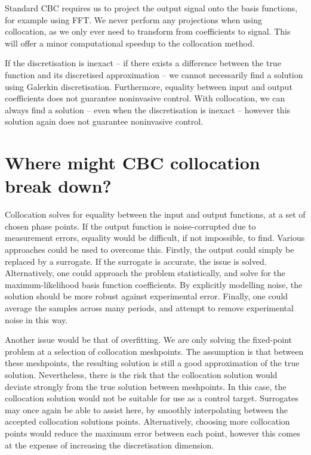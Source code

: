 \documentclass[11pt]{article}
\begin{document}
Standard CBC requires us to project the output signal onto the basis functions, for example using FFT.
We never perform any projections when using collocation, as we only ever need to transform from coefficients to signal.
This will offer a minor computational speedup to the collocation method.

If the discretisation is inexact -- if there exists a difference between the true function and its discretised approximation -- we cannot necessarily find a solution using Galerkin discretisation.
Furthermore, equality between input and output coefficients does not guarantee noninvasive control.
With collocation, we can always find a solution -- even when the discretisation is inexact -- however this solution again does not guarantee noninvasive control.

\section{Where might CBC collocation break down?}
\label{sec:org9f25bbd}

Collocation solves for equality between the input and output functions, at a set of chosen phase points.
If the output function is noise-corrupted due to measurement errors, equality would be difficult, if not impossible, to find.
Various approaches could be used to overcome this.
Firstly, the output could simply be replaced by a surrogate.
If the surrogate is accurate, the issue is solved.
Alternatively, one could approach the problem statistically, and solve for the maximum-likelihood basis function coefficients.
By explicitly modelling noise, the solution should be more robust against experimental error.
Finally, one could average the samples across many periods, and attempt to remove experimental noise in this way.

Another issue would be that of overfitting.
We are only solving the fixed-point problem at a selection of collocation meshpoints.
The assumption is that between these meshpoints, the resulting solution is still a good approximation of the true solution.
Nevertheless, there is the risk that the collocation solution would deviate strongly from the true solution between meshpoints.
In this case, the collocation solution would not be suitable for use as a control target.
Surrogates may once again be able to assist here, by smoothly interpolating between the accepted collocation solutions points.
Alternatively, choosing more collocation points would reduce the maximum error between each point, however this comes at the expense of increasing the discretisation dimension.
\end{document}
